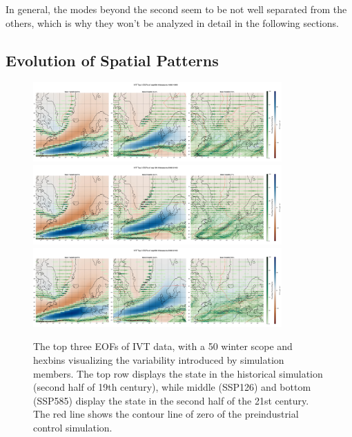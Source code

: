 In general, the modes beyond the second seem to be not well separated from the others, which is why they won't be analyzed in detail in the following sections. 

\subsection{Evolution of Spatial Patterns}

\begin{figure}[htb]
  \begin{center}
    \includegraphics[width=0.85\textwidth]{figures/ivt_spat_patterns_hexbin_18501899_ssp585_50seasons.png}
    \includegraphics[width=0.85\textwidth]{figures/ivt_spat_patterns_hexbin_20502100_ssp126_50seasons.png}
    \includegraphics[width=0.85\textwidth]{figures/ivt_spat_patterns_hexbin_20502100_ssp585_50seasons.png}
  \end{center}
  \caption{The top three EOFs of IVT data, with a 50 winter scope and hexbins visualizing the variability introduced by simulation members. The top row displays the state in the historical simulation (second half of 19th century), while middle (SSP126) and bottom (SSP585) display the state in the second half of the 21st century. The red line shows the contour line of zero of the preindustrial control simulation. }\label{fig:ivt eof evolution}
\end{figure}


